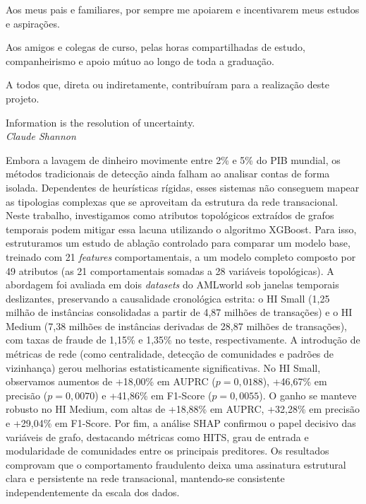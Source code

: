 \documentclass[a4paper,12pt,oneside,onecolumn,final,fleqn]{repUERJ}
\begin{document}
Aos meus pais e familiares, por sempre me apoiarem e incentivarem meus estudos e aspirações.

Aos amigos e colegas de curso, pelas horas compartilhadas de estudo, companheirismo e apoio mútuo ao longo de toda a graduação.

A todos que, direta ou indiretamente, contribuíram para a realização deste projeto.
%
%
\pretextualchapter{}
  \vfill
  \vspace*{10cm}
  \begin{flushright}
  Information is the resolution of uncertainty.\\
  \vspace{0.2cm}
  \textit{Claude Shannon}
  \end{flushright}
%
%

Embora a lavagem de dinheiro movimente entre 2\% e 5\% do PIB mundial, os métodos tradicionais de detecção ainda falham ao analisar contas de forma isolada. Dependentes de heurísticas rígidas, esses sistemas não conseguem mapear as tipologias complexas que se aproveitam da estrutura da rede transacional. Neste trabalho, investigamos como atributos topológicos extraídos de grafos temporais podem mitigar essa lacuna utilizando o algoritmo XGBoost. Para isso, estruturamos um estudo de ablação controlado para comparar um modelo base, treinado com 21 \textit{features} comportamentais, a um modelo completo composto por 49 atributos (as 21 comportamentais somadas a 28 variáveis topológicas). A abordagem foi avaliada em dois \textit{datasets} do AMLworld sob janelas temporais deslizantes, preservando a causalidade cronológica estrita: o HI Small (1,25 milhão de instâncias consolidadas a partir de 4,87 milhões de transações) e o HI Medium (7,38 milhões de instâncias derivadas de 28,87 milhões de transações), com taxas de fraude de 1,15\% e 1,35\% no teste, respectivamente. A introdução de métricas de rede (como centralidade, detecção de comunidades e padrões de vizinhança) gerou melhorias estatisticamente significativas. No HI Small, observamos aumentos de +18,00\% em AUPRC ($p=0{,}0188$), +46,67\% em precisão ($p=0{,}0070$) e +41,86\% em F1-Score ($p=0{,}0055$). O ganho se manteve robusto no HI Medium, com altas de +18,88\% em AUPRC, +32,28\% em precisão e +29,04\% em F1-Score. Por fim, a análise SHAP confirmou o papel decisivo das variáveis de grafo, destacando métricas como HITS, grau de entrada e modularidade de comunidades entre os principais preditores. Os resultados comprovam que o comportamento fraudulento deixa uma assinatura estrutural clara e persistente na rede transacional, mantendo-se consistente independentemente da escala dos dados.\\
\end{document}
